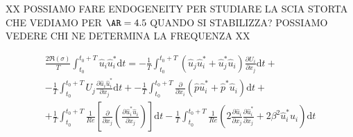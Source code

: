 XX POSSIAMO FARE ENDOGENEITY PER STUDIARE LA SCIA STORTA CHE VEDIAMO PER $\AR=4.5$ QUANDO SI STABILIZZA? POSSIAMO VEDERE CHI NE DETERMINA LA FREQUENZA XX

\begin{equation}
  \begin{gathered}
  \frac{2 \Re(\sigma)}{T} \int_{t_0}^{t_0+T} \hat{u}_i \hat{u}_i^* \text{d}t = 
 -\frac{1}{T} \int_{t_0}^{t_0+T} \left( \hat{u}_j \hat{u}_i^* + \hat{u}_j^* \hat{u}_i \right) \frac{\partial U_i}{\partial x_j} \text{d} t +\\
 -\frac{1}{T} \int_{t_0}^{t_0+T} U_j \frac{\partial \hat{u}_i \hat{u}_i^*}{\partial x_j} \text{d} t + 
 -\frac{1}{T} \int_{t_0}^{t_0+T} \frac{\partial}{\partial x_i} \left( \hat{p} \hat{u}_i^* + \hat{p}^* \hat{u}_i \right) \text{d}t + \\
 +\frac{1}{T} \int_{t_0}^{t_0+T} \frac{1}{Re} \left[ \frac{\partial}{\partial x_j} \left( \frac{\partial \hat{u}_i^* \hat{u}_i }{\partial x_j} \right) \right] \text{d}t 
 -\frac{1}{T} \int_{t_0}^{t_0+T} \frac{1}{Re} \left( 2 \frac{\partial \hat{u}_i}{\partial x_j} \frac{\partial \hat{u}_i^*}{\partial x_j} + 2 \beta^2 \hat{u}_i^* \hat{u}_i \right) \text{d} t
 \end{gathered}
\end{equation}


